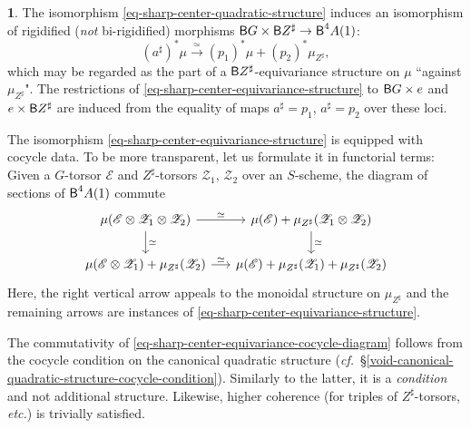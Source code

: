 \documentclass[10pt,english,reqno]{amsart}
\newcommand{\deloop}{\textnormal{\textsf{B}}}
\theoremstyle{definition}
\numberwithin{equation}{section}
\newtheorem{untitledsubsubsection}[subsubsection]{}
\newenvironment{void}
{\begin{untitledsubsubsection}}
{\end{untitledsubsubsection}}
\begin{document}
\begin{void}
\label{void-sharp-center-equivariance-structure}
The isomorphism \eqref{eq-sharp-center-quadratic-structure} induces an isomorphism of rigidified (\emph{not} bi-rigidified) morphisms $\deloop G \times \deloop Z^{\sharp} \rightarrow \deloop^4A(1)$:
\begin{equation}
\label{eq-sharp-center-equivariance-structure}
(a^{\sharp})^*\mu \xrightarrow{\simeq} (p_1)^*\mu + (p_2)^*\mu_{Z^{\sharp}},
\end{equation}
which may be regarded as the part of a $\deloop Z^{\sharp}$-equivariance structure on $\mu$ ``against $\mu_{Z^{\sharp}}$". The restrictions of \eqref{eq-sharp-center-equivariance-structure} to $\deloop G \times e$ and $e \times \deloop Z^{\sharp}$ are induced from the equality of maps $a^{\sharp} = p_1$, $a^{\sharp} = p_2$ over these loci.

The isomorphism \eqref{eq-sharp-center-equivariance-structure} is equipped with cocycle data. To be more transparent, let us formulate it in functorial terms: Given a $G$-torsor $\mathscr E$ and $Z^{\sharp}$-torsors $\mathscr Z_1$, $\mathscr Z_2$ over an $S$-scheme, the diagram of sections of $\deloop^4A(1)$ commute
\begin{equation}
\label{eq-sharp-center-equivariance-cocycle-diagram}
\begin{tikzcd}[column sep = 1.5em]
	\mu(\mathscr E \otimes \mathscr Z_1 \otimes \mathscr Z_2) \ar[r, "\simeq"]\ar[d, "\simeq"] & \mu(\mathscr E) + \mu_{Z^{\sharp}}(\mathscr Z_1\otimes\mathscr Z_2) \ar[d, "\simeq"] \\
	\mu(\mathscr E \otimes \mathscr Z_1) + \mu_{Z^{\sharp}}(\mathscr Z_2) \ar[r, "\simeq"] & \mu(\mathscr E) + \mu_{Z^{\sharp}}(\mathscr Z_1) + \mu_{Z^{\sharp}}(\mathscr Z_2)
\end{tikzcd}
\end{equation}
Here, the right vertical arrow appeals to the monoidal structure on $\mu_{Z^{\sharp}}$ and the remaining arrows are instances of \eqref{eq-sharp-center-equivariance-structure}.

The commutativity of \eqref{eq-sharp-center-equivariance-cocycle-diagram} follows from the cocycle condition on the canonical quadratic structure (\emph{cf.}~\S\ref{void-canonical-quadratic-structure-cocycle-condition}). Similarly to the latter, it is a \emph{condition} and not additional structure. Likewise, higher coherence (for triples of $Z^{\sharp}$-torsors, \emph{etc.}) is trivially satisfied.
\end{void}
\end{document}
